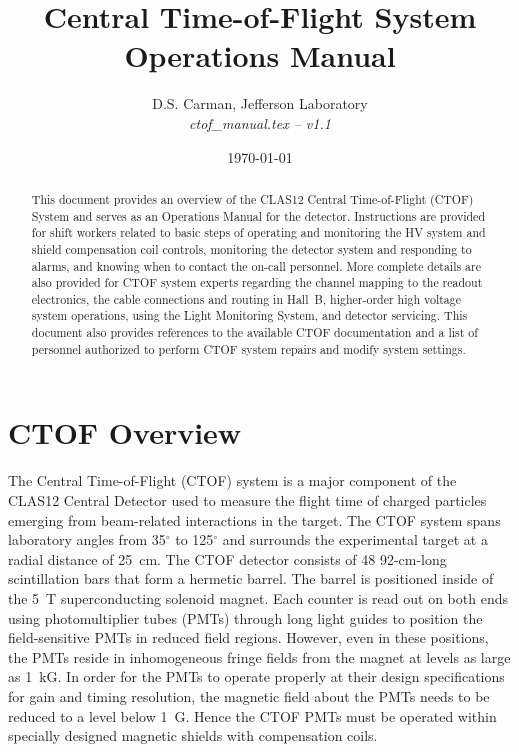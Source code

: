 \documentclass[12pt]{article}
\begin{document}
\title{Central Time-of-Flight System Operations Manual}

\vskip 0.5cm

\author{D.S. Carman, Jefferson Laboratory\\[0.2ex]
{\it ctof\_manual.tex -- v1.1}}

\date \today
%
\maketitle

\begin{abstract}
This document provides an overview of the CLAS12 Central Time-of-Flight (CTOF) System and serves 
as an Operations Manual for the detector. Instructions are provided for shift workers related to 
basic steps of operating and monitoring the HV system and shield compensation coil controls, 
monitoring the detector system and responding to alarms, and knowing when to contact the on-call 
personnel. More complete details are also provided for CTOF system experts regarding the channel 
mapping to the readout electronics, the cable connections and routing in Hall~B, higher-order 
high voltage system operations, using the Light Monitoring System, and detector servicing. This 
document also provides references to the available CTOF documentation and a list of personnel 
authorized to perform CTOF system repairs and modify system settings.
\end{abstract}

\thispagestyle{empty}

\clearpage

\vfil
\eject

\tableofcontents

\vfil
\eject

\section{CTOF Overview}
\label{intro}

The Central Time-of-Flight (CTOF) system is a major component of the CLAS12 Central Detector used 
to measure the flight time of charged particles emerging from beam-related interactions in the 
target. The CTOF system spans laboratory angles from 35$^\circ$ to 125$^\circ$ and surrounds the 
experimental target at a radial distance of 25~cm. The CTOF detector consists of 48 92-cm-long 
scintillation bars that form a hermetic barrel. The barrel is positioned inside of the 5~T 
superconducting solenoid magnet. Each counter is read out on both ends using photomultiplier 
tubes (PMTs) through long light guides to position the field-sensitive PMTs in reduced field 
regions. However, even in these positions, the PMTs reside in inhomogeneous fringe fields from 
the magnet at levels as large as 1~kG. In order for the PMTs to operate properly at their design 
specifications for gain and timing resolution, the magnetic field about the PMTs needs to be 
reduced to a level below 1~G. Hence the CTOF PMTs must be operated within specially designed 
magnetic shields with compensation coils.
\end{document}
